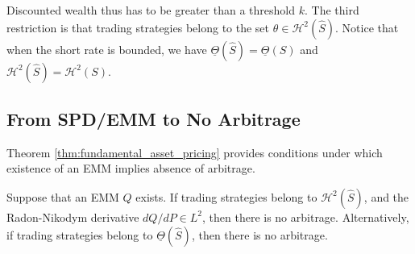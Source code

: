\documentclass[\topdir/lecture\_notes.tex]{subfiles}
\begin{document}
Discounted wealth thus has to be greater than a threshold \(k\). The third restriction is that trading strategies belong to the set \(\theta \in \mathcal{H}^{2}(\hat{S})\). Notice that when the short rate is bounded, we have \(\underline{\Theta}(\hat{S})=\underline{\Theta}(S)\) and \(\mathcal{H}^{2}(\hat{S})=\mathcal{H}^{2}(S)\).

\subsection{From SPD/EMM to No Arbitrage}
Theorem \ref{thm:fundamental_asset_pricing} provides conditions under which existence of an EMM implies absence of arbitrage.

\begin{theorem}\label{thm:fundamental_asset_pricing}
Suppose that an EMM \(Q\) exists. If trading strategies belong to \(\mathcal{H}^{2}(\hat{S})\), and the Radon-Nikodym derivative \(d Q / d P \in L^{2}\), then there is no arbitrage. Alternatively, if trading strategies belong to \(\underline{\Theta}(\hat{S})\), then there is no arbitrage.
\end{theorem}
\end{document}
